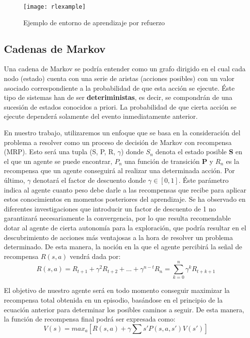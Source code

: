 \documentclass[11pt,spanish,listoffigures,listoftables]{tfgetsinf}
\begin{document}
\begin{figure}[h]
	\centering
	\texttt{[image: rlexample]}
	\caption{Ejemplo de entorno de aprendizaje por refuerzo}
\end{figure}

\subsection{Cadenas de Markov}

Una cadena de Markov se podría entender como un grafo dirigido en el cual cada nodo (estado) cuenta con una serie de aristas (acciones posibles) con un valor asociado correspondiente a la probabilidad de que esta acción se ejecute. Éste tipo de sistemas han de ser \textbf{deteriministas}, es decir, se compondrán de una sucesión de estados conocidos a priori. La probabilidad de que cierta acción se ejecute dependerá solamente del evento inmediatamente anterior.

En nuestro trabajo, utilizaremos un enfoque que se basa en la consideración del problema a resolver como un proceso de decisión de Markov con recompensa (MRP). Esto será una tupla (S, P, R, $\gamma$) donde $S_{n}$ denota el estado posible \textbf{S}  en el que un agente se puede encontrar, $P_{n}$ una función de transición \textbf{P} y $R_{n}$ es la recompensa que un agente conseguirá al realizar una determinada acción. Por último, $\gamma$ denotará el factor de descuento donde $\gamma \in [0,1]$. Éste parámetro indica al agente cuanto peso debe darle a las recompensas que recibe para aplicar estos conocimientos en momentos posteriores del aprendizaje. Se ha observado en diferentes investigaciones que introducir un factor de descuento de 1 no garantizará necesariamente la convergencia, por lo que resulta recomendable dotar al agente de cierta autonomía para la exploración, que podría resultar en el descubrimiento de acciones más ventajosas a la hora de resolver un problema determinado. De esta manera, la noción en la que el agente percibirá la señal de recompensa \textbf{$R(s,a)$} vendrá dada por:
\[R(s,a) = R_{t+1} + \gamma^{2}R_{t+2} + ... + \gamma^{n-t}R_{n} = \displaystyle\sum_{k=0}^{n} \gamma^{k} R_{t+k+1} \]

El objetivo de nuestro agente será en todo momento conseguir maximizar la recompensa total obtenida en un episodio, basándose en el principio de la ecuación anterior para determinar los posibles caminos a seguir. De esta manera, la función de recompensa final podrá ser expresada como:  \[V(s) = max_{a}[R(s,a) + \gamma \sum{s'}P(s,a,s') V(s')]\]
\end{document}
